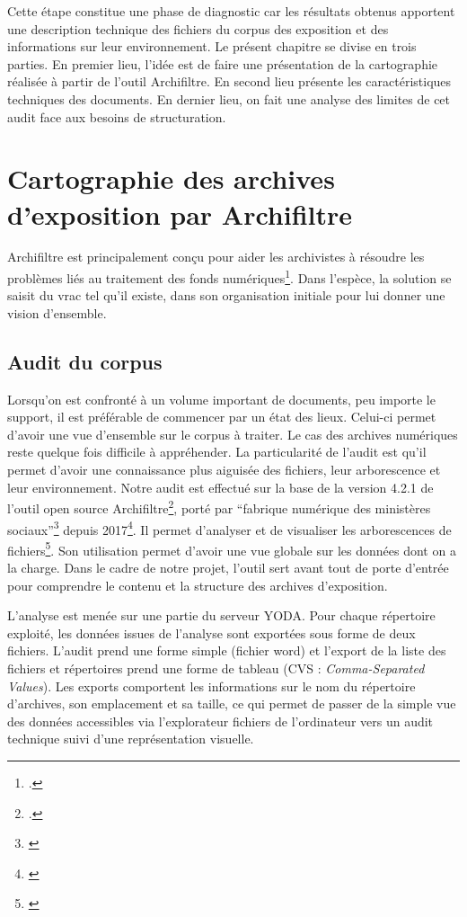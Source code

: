 Cette étape constitue une phase de diagnostic car les résultats obtenus apportent une description technique des fichiers du corpus des exposition et des informations sur leur environnement. Le présent chapitre se divise en trois parties. En premier lieu, l’idée est de faire une présentation de la cartographie réalisée à partir de l'outil Archifiltre. En second lieu présente les caractéristiques techniques des documents. En dernier lieu, on fait une analyse des limites de cet audit face aux besoins de structuration.


\section{Cartographie des archives d’exposition par Archifiltre}

Archifiltre est principalement conçu pour aider les archivistes à résoudre les problèmes liés au traitement des fonds numériques\footnote{\cite{beta-gouv-archifiltre}.}. Dans l'espèce, la solution se saisit du vrac tel qu'il existe, dans son organisation initiale pour lui donner une vision d'ensemble. 

\subsection*{Audit du corpus}

Lorsqu'on est confronté à un volume important de documents, peu importe le support, il est préférable de commencer par un état des lieux. Celui-ci permet d'avoir une vue d'ensemble sur le corpus à traiter. Le cas des archives numériques reste quelque fois difficile à appréhender. 
La particularité de l'audit est qu'il permet d'avoir une connaissance plus aiguisée des fichiers, leur arborescence et leur environnement. Notre audit est effectué sur la base de la version 4.2.1 de l'outil open source Archifiltre\footnote{\cite{programme-vitam-archifiltre}.}, porté par \enquote{fabrique numérique des ministères sociaux}\footnote{\cite{beta-gouv-archifiltre}} depuis 2017\footnote{\cite{programme-vitam-archifiltre}}. Il permet d'analyser et de visualiser les arborescences de  fichiers\footnote{\cite{beta-gouv-archifiltre}}. Son utilisation permet d’avoir une vue globale sur les données dont on a la charge. Dans le cadre de notre projet, l'outil sert avant tout de porte d'entrée pour comprendre le contenu et la structure des archives d'exposition. 

L'analyse est menée sur une partie du serveur YODA. Pour chaque répertoire exploité, les données issues de l'analyse sont exportées sous forme de  deux fichiers. L'audit prend une forme simple (fichier word) et l'export de la liste des fichiers et répertoires prend une forme de tableau (CVS : \textit{Comma-Separated Values}). Les exports comportent les informations sur le nom du répertoire d'archives, son emplacement et sa taille, ce qui permet de passer de la simple vue des données accessibles via l'explorateur fichiers de l'ordinateur vers un audit technique suivi d'une représentation visuelle.

